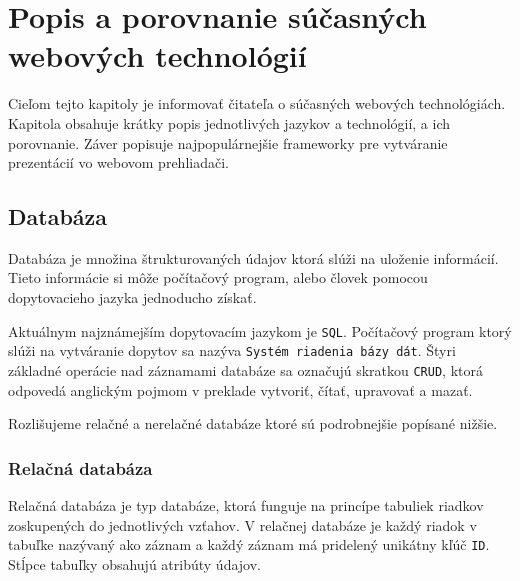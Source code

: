 \chapter{Popis a porovnanie súčasných webových technológií}
Cieľom tejto kapitoly je informovať čitateľa o súčasných webových technológiách. Kapitola obsahuje krátky popis jednotlivých jazykov a technológií, a ich porovnanie. Záver popisuje najpopulárnejšie frameworky pre vytváranie prezentácií vo webovom prehliadači.

\section{Databáza}
Databáza\cite{database} je množina štrukturovaných údajov ktorá slúži na uloženie informácií. Tieto informácie si môže počítačový program, alebo človek pomocou dopytovacieho jazyka jednoducho získať. 

Aktuálnym najznámejším dopytovacím jazykom je \texttt{SQL}. Počítačový program ktorý slúži na vytváranie dopytov sa nazýva \texttt{Systém riadenia bázy dát}. Štyri základné operácie nad záznamami databáze sa označujú skratkou \texttt{CRUD}, ktorá odpovedá anglickým pojmom v preklade vytvoriť, čítať, upravovať a mazať. 

Rozlišujeme relačné a nerelačné databáze ktoré sú podrobnejšie popísané nižšie.

\subsection{Relačná databáza}
Relačná databáza je typ databáze, ktorá funguje na princípe tabuliek riadkov zoskupených do jednotlivých vzťahov. V relačnej databáze je každý riadok v tabuľke nazývaný ako záznam a každý záznam má pridelený unikátny kľúč \texttt{ID}. Stĺpce tabuľky obsahujú atribúty údajov.

